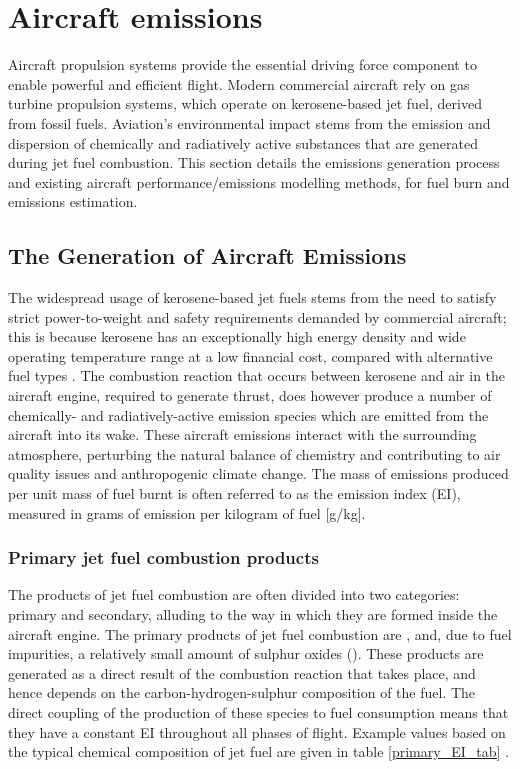 \section{Aircraft emissions}
\label{emissions}
Aircraft propulsion systems provide the essential driving force component to enable powerful and efficient flight. Modern commercial aircraft rely on gas turbine propulsion systems, which operate on kerosene-based jet fuel, derived from fossil fuels. Aviation's environmental impact stems from the emission and dispersion of chemically and radiatively active substances that are generated during jet fuel combustion. This section details the emissions generation process and existing aircraft performance/emissions modelling methods, for fuel burn and emissions estimation.

\subsection{The Generation of Aircraft Emissions}
The widespread usage of kerosene-based jet fuels stems from the need to satisfy strict power-to-weight and safety requirements demanded by commercial aircraft; this is because kerosene has an exceptionally high energy density and wide operating temperature range at a low financial cost, compared with alternative fuel types \cite{Hemighaus2007, USDOE_2020}. The combustion reaction that occurs between kerosene and air in the aircraft engine, required to generate thrust, does however produce a number of chemically- and radiatively-active emission species which are emitted from the aircraft into its wake. These aircraft emissions interact with the surrounding atmosphere, perturbing the natural balance of chemistry and contributing to air quality issues and anthropogenic climate change. The mass of emissions produced per unit mass of fuel burnt is often referred to as the emission index (EI), measured in grams of emission per kilogram of fuel [g/kg].

\subsubsection{Primary jet fuel combustion products}
The products of jet fuel combustion are often divided into two categories: primary and secondary, alluding to the way in which they are formed inside the aircraft engine. The primary products of jet fuel combustion are ,  and, due to fuel impurities, a relatively small amount of sulphur oxides (). These products are generated as a direct result of the combustion reaction that takes place, and hence depends on the carbon-hydrogen-sulphur composition of the fuel. The direct coupling of the production of these species to fuel consumption means that they have a constant EI throughout all phases of flight. Example values based on the typical chemical composition of jet fuel are given in table \ref{primary_EI_tab} \cite{IPCC1999}.

